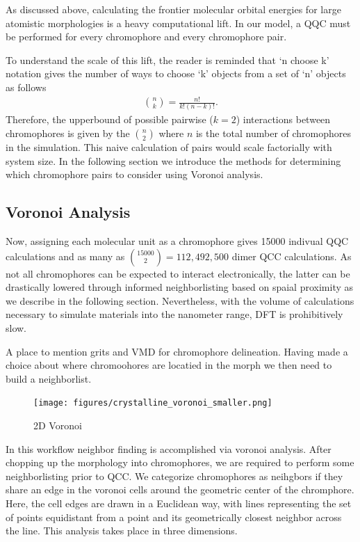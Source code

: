As discussed above, calculating the frontier molecular orbital energies for large atomistic morphologies is
a heavy computational lift. 
In our model, a QQC must be performed for every chromophore and every chromophore pair. 

To understand the scale of this lift, the reader is reminded that
`n choose k' notation gives the number of ways to choose `k' objects from a set of 
`n' objects as follows 
\begin{align}
    {n \choose k} =  \frac{n!}{k!(n-k)!}.
\end{align}
Therefore, the upperbound of possible pairwise ($k=2$) interactions between chromophores is given by the 
$n \choose 2$ where $n$ is the total number of chromophores in the simulation. This naive calculation of pairs
would scale factorially with system size. In the following section we introduce the methods for determining
which chromophore pairs to consider using Voronoi analysis. 

\subsection{Voronoi Analysis}

Now, assigning each molecular unit as a chromophore
gives 15000 indivual QQC calculations and as many as ${15000 \choose 2} = 112,492,500$
dimer QCC calculations. As not all chromophores can be expected to interact electronically,
the latter can be drastically lowered through informed neighborlisting based on spaial proximity as we describe
in the following section. Nevertheless, with the volume of calculations necessary to simulate materials into the
nanometer range, DFT is prohibitively slow. 


A place to mention grits and VMD for chromophore delineation. Having made a choice about where chromoohores
are locatied in the morph we then need to build a neighborlist. 


\begin{figure}
  \center
  \texttt{[image: figures/crystalline\_voronoi\_smaller.png]} 
  \caption{2D Voronoi}
  \label{fig:2d}
\end{figure}

 In this workflow neighbor finding is accomplished via
voronoi analysis.
After chopping up the morphology into chromophores, we are required to perform some neighborlisting prior to
QCC. We categorize chromophores as
neihgbors if they share an edge in the voronoi cells around the geometric center of the chromphore. Here, the
cell edges are drawn in a Euclidean way, with lines representing the set of points equidistant from a point
and its geometrically closest neighbor across the line. This analysis takes place in three dimensions. 

